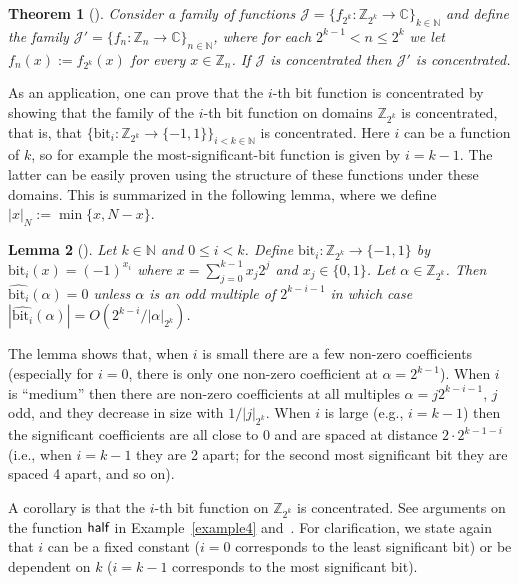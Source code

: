 \documentclass[11pt]{article}
\newtheorem{theorem}{Theorem}
\newtheorem{lemma}[theorem]{Lemma}
\theoremstyle{definition}
\newcommand{\N}{\mathbb{N}}
\newcommand{\Z}{\mathbb{Z}}
\newcommand{\C}{\mathbb{C}}
\newcommand{\half}{\text{\sf half}}
\newcommand{\famly}{\mathscr{J}}
\newcommand{\bit}{\text{bit}}
\begin{document}
\begin{theorem}[{\cite[Theorem 6.1]{LS}}]\label{thm:mod-switch}
    Consider a family of functions $\famly = \{ f_{2^k}:\Z_{2^k} \to \C \}_{k\in\N}$ and define the family $\famly' = \{ f_n:\Z_n \to \C \}_{n\in\N}$, where for each $2^{k-1} < n \leq 2^k$ we let $f_n(x) := f_{2^k}(x)$ for every $x\in\Z_n$.
    If $\famly$ is concentrated then $\famly'$ is concentrated.
\end{theorem}

As an application, one can prove that the $i$-th bit function is concentrated by showing that the family of the $i$-th bit function on domains $\Z_{2^k}$ is concentrated, that is, that $\{\bit_i : \Z_{2^k} \to \{-1,1\}\}_{i<k\in\N}$ is concentrated. Here $i$ can be a function of $k$, so for example the most-significant-bit function is given by $i=k-1$. The latter can be easily proven using the structure of these functions under these domains. This is summarized in the following lemma, where we define $|x|_N := \min \{x,N-x\}$.

\begin{lemma}[{\cite[Lemma 6.2]{LS}}]
    Let $k \in \N$ and $0 \le i < k$.
    Define $\bit_i : \Z_{2^k} \to \{-1,1\}$ by
    $\bit_i(x) = (-1)^{x_i}$ where $x = \sum_{j=0}^{k-1} x_j 2^j$ and $x_j \in \{ 0,1 \}$.
    Let $\alpha \in \Z_{2^k}$.
    Then $\widehat{\bit_i}(\alpha) = 0$ unless $\alpha$ is an odd multiple of $2^{k-i-1}$ in which case $| \widehat{\bit_i}(\alpha)| = O( 2^{k-i}/|\alpha|_{2^k} )$.
\end{lemma}

The lemma shows that, when $i$ is small there are a few non-zero coefficients (especially for $i=0$, there is only one non-zero coefficient at $\alpha = 2^{k-1}$).
When $i$ is ``medium'' then there are non-zero coefficients at all multiples $\alpha = j 2^{k-i-1}$, $j$ odd, and they decrease in size with $1/|j|_{2^k}$.
When $i$ is large (e.g., $i = k-1$) then the significant coefficients are all close to $0$ and are spaced at distance $2\cdot2^{k-1-i}$ (i.e., when $i = k-1$ they are 2 apart; for the second most significant bit they are spaced 4 apart, and so on).

A corollary is that the $i$-th bit function on $\Z_{2^k}$ is concentrated. See arguments on the function $\half$ in Example~\ref{example4} and~\cite[Claim 4.1]{AGS}. For clarification, we state again that $i$ can be a fixed constant ($i=0$ corresponds to the least significant bit) or be dependent on $k$ ($i=k-1$ corresponds to the most significant bit).
\end{document}

